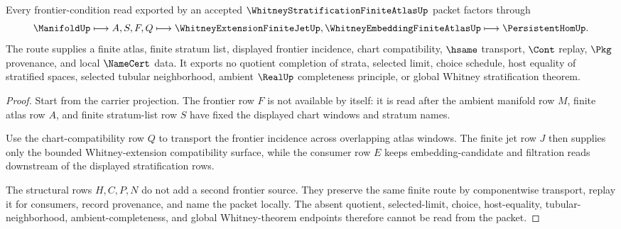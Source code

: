 \begin{theorem}
\label{thm:whitney-stratification-frontier-condition-route}
Every frontier-condition read exported by an accepted $\WhitneyStratificationFiniteAtlasUp$ packet factors through
$$
\ManifoldUp \longmapsto A,S,F,Q \longmapsto \WhitneyExtensionFiniteJetUp,\WhitneyEmbeddingFiniteAtlasUp \longmapsto \PersistentHomUp .
$$
The route supplies a finite atlas, finite stratum list, displayed frontier incidence, chart compatibility, $\hsame$ transport, $\Cont$ replay, $\Pkg$ provenance, and local $\NameCert$ data. It exports no quotient completion of strata, selected limit, choice schedule, host equality of stratified spaces, selected tubular neighborhood, ambient $\RealUp$ completeness principle, or global Whitney stratification theorem.
\end{theorem}
\begin{proof}
Start from the carrier projection. The frontier row $F$ is not available by itself: it is read after the ambient manifold row $M$, finite atlas row $A$, and finite stratum-list row $S$ have fixed the displayed chart windows and stratum names.

Use the chart-compatibility row $Q$ to transport the frontier incidence across overlapping atlas windows. The finite jet row $J$ then supplies only the bounded Whitney-extension compatibility surface, while the consumer row $E$ keeps embedding-candidate and filtration reads downstream of the displayed stratification rows.

The structural rows $H,C,P,N$ do not add a second frontier source. They preserve the same finite route by componentwise transport, replay it for consumers, record provenance, and name the packet locally. The absent quotient, selected-limit, choice, host-equality, tubular-neighborhood, ambient-completeness, and global Whitney-theorem endpoints therefore cannot be read from the packet.
\end{proof}




